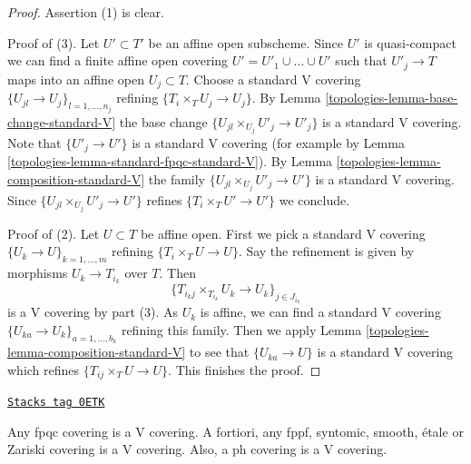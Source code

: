\begin{proof}

Assertion (1) is clear.

\medskip\noindent
Proof of (3).
Let $U' \subset T'$ be an affine open subscheme.
Since $U'$ is quasi-compact we can find a finite affine open
covering $U' = U'_1 \cup \ldots \cup U'$ such that
$U'_j \to T$ maps into an affine open $U_j \subset T$.
Choose a standard V covering $\{U_{jl} \to U_j\}_{l = 1, \ldots, n_j}$
refining $\{T_i \times_T U_j \to U_j\}$.
By Lemma \ref{topologies-lemma-base-change-standard-V}
the base change $\{U_{jl} \times_{U_j} U'_j \to U'_j\}$
is a standard V covering. Note that $\{U'_j \to U'\}$
is a standard V covering
(for example by Lemma \ref{topologies-lemma-standard-fpqc-standard-V}).
By Lemma \ref{topologies-lemma-composition-standard-V}
the family $\{U_{jl} \times_{U_j} U'_j \to U'\}$
is a standard V covering. Since
$\{U_{jl} \times_{U_j} U'_j \to U'\}$ refines $\{T_i \times_T U' \to U'\}$
we conclude.

\medskip\noindent
Proof of (2).
Let $U \subset T$ be affine open. First we pick a standard V covering
$\{U_k \to U\}_{k = 1, \ldots, m}$ refining
$\{T_i \times_T U \to U\}$.
Say the refinement is given by morphisms $U_k \to T_{i_k}$ over $T$.
Then
$$
\{T_{i_kj} \times_{T_{i_k}} U_k \to U_k\}_{j \in J_{i_k}}
$$
is a V covering by part (3). As $U_k$ is affine,
we can find a standard V covering
$\{U_{ka} \to U_k\}_{a = 1, \ldots, b_k}$ refining this family.
Then we apply Lemma \ref{topologies-lemma-composition-standard-V}
to see that $\{U_{ka} \to U\}$ is a standard V covering which
refines $\{T_{ij} \times_T U \to U\}$. This finishes the proof.
\end{proof}

\begin{lemma}
\label{topologies-lemma-zariski-etale-smooth-syntomic-fppf-fpqc-ph-V}
\href{https://stacks.math.columbia.edu/tag/0ETK}{\texttt{Stacks tag 0ETK}}

Any fpqc covering is a V covering. A fortiori,
any fppf, syntomic, smooth, \'etale or Zariski covering is a V covering.
Also, a ph covering is a V covering.
\end{lemma}


